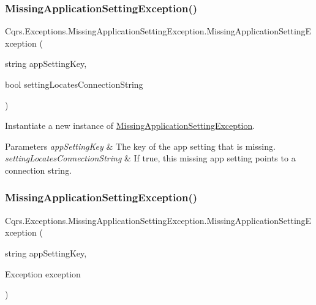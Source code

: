 \subsubsection{\texorpdfstring{Missing\+Application\+Setting\+Exception()}{MissingApplicationSettingException()}\hspace{0.1cm}{\footnotesize\ttfamily [2/4]}}
{\footnotesize\ttfamily Cqrs.\+Exceptions.\+Missing\+Application\+Setting\+Exception.\+Missing\+Application\+Setting\+Exception (\begin{DoxyParamCaption}\item[{string}]{app\+Setting\+Key,  }\item[{bool}]{setting\+Locates\+Connection\+String }\end{DoxyParamCaption})\hspace{0.3cm}{\ttfamily [protected]}}



Instantiate a new instance of \hyperlink{classCqrs_1_1Exceptions_1_1MissingApplicationSettingException}{Missing\+Application\+Setting\+Exception}. 


\begin{DoxyParams}{Parameters}
{\em app\+Setting\+Key} & The key of the app setting that is missing.\\
\hline
{\em setting\+Locates\+Connection\+String} & If true, this missing app setting points to a connection string.\\
\hline
\end{DoxyParams}
\mbox{\label{classCqrs_1_1Exceptions_1_1MissingApplicationSettingException_a65e4f7ddf118364bfc59b27978d9b29d_a65e4f7ddf118364bfc59b27978d9b29d}} 
\subsubsection{\texorpdfstring{Missing\+Application\+Setting\+Exception()}{MissingApplicationSettingException()}\hspace{0.1cm}{\footnotesize\ttfamily [3/4]}}
{\footnotesize\ttfamily Cqrs.\+Exceptions.\+Missing\+Application\+Setting\+Exception.\+Missing\+Application\+Setting\+Exception (\begin{DoxyParamCaption}\item[{string}]{app\+Setting\+Key,  }\item[{Exception}]{exception }\end{DoxyParamCaption})}



